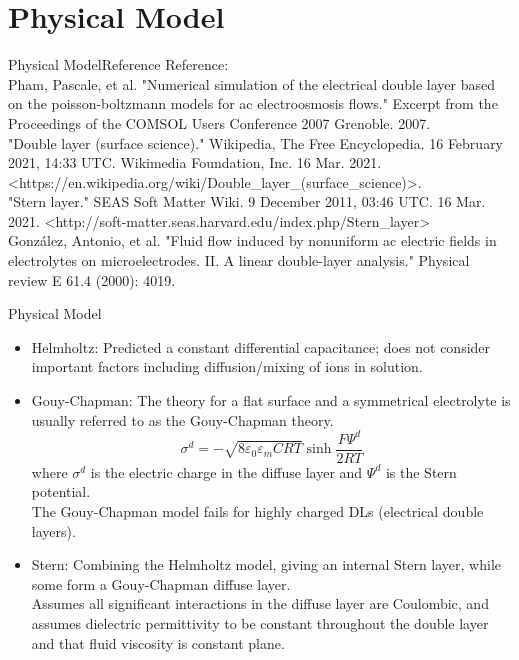 \documentclass[10pt]{beamer}
\begin{document}
\section{Physical Model}
\begin{frame}{Physical Model}{Reference}
    Reference:\\
    Pham, Pascale, et al. "Numerical simulation of the electrical double layer based on the poisson-boltzmann models for ac electroosmosis flows." Excerpt from the Proceedings of the COMSOL Users Conference 2007 Grenoble. 2007.\\
    "Double layer (surface science)." Wikipedia, The Free Encyclopedia. 16 February 2021, 14:33 UTC. Wikimedia Foundation, Inc. 16 Mar. 2021. <https://en.wikipedia.org/wiki/Double\_layer\_(surface\_science)>.\\
    "Stern layer." SEAS Soft Matter Wiki. 9 December 2011, 03:46 UTC. 16 Mar. 2021. <http://soft-matter.seas.harvard.edu/index.php/Stern\_layer>\\
    González, Antonio, et al. "Fluid flow induced by nonuniform ac electric fields in electrolytes on microelectrodes. II. A linear double-layer analysis." Physical review E 61.4 (2000): 4019.
\end{frame}
\begin{frame}{Physical Model}
    \begin{itemize}
        \item Helmholtz: Predicted a constant differential capacitance; does not consider important factors including diffusion/mixing of ions in solution.
        \item Gouy-Chapman: The theory for a flat surface and a symmetrical electrolyte is usually referred to as the Gouy-Chapman theory.
              \[\sigma^d=-\sqrt{8\varepsilon_0\varepsilon_mCRT}\sinh{\frac{F\Psi^d}{2RT}}\]
              where $\sigma^d$ is the electric charge in the diffuse layer and $\Psi^d$ is the Stern potential.\\
              The Gouy-Chapman model fails for highly charged DLs (electrical double layers).
        \item Stern: Combining the Helmholtz model, giving an internal Stern layer, while some form a Gouy-Chapman diffuse layer.\\
              Assumes all significant interactions in the diffuse layer are Coulombic, and assumes dielectric permittivity to be constant throughout the double layer and that fluid viscosity is constant plane.
    \end{itemize}
\end{frame}
\end{document}
